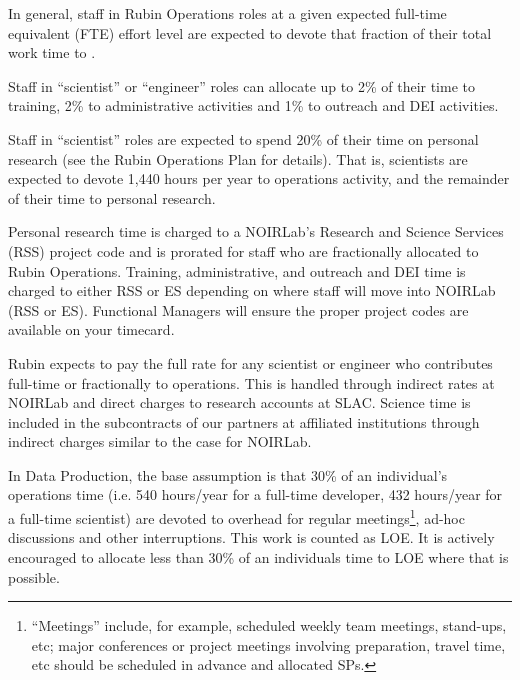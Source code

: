 In general, staff in Rubin Operations roles at a given expected full-time equivalent (FTE) effort level are expected to devote that fraction of their total work time to \RO.

Staff in ``scientist'' or ``engineer'' roles can allocate up to 2\% of their time to training, 2\% to administrative activities and 1\% to outreach and DEI activities.

Staff in ``scientist'' roles are expected to spend 20\% of their time on personal research (see the Rubin Operations Plan for details).
That is, scientists are expected to devote 1,440 hours per
year to operations activity, and the remainder of their time to personal research.

Personal research time is charged to a NOIRLab's Research and Science Services (RSS) project code and is prorated for staff who are fractionally allocated to Rubin Operations. 
Training, administrative, and outreach and DEI time is charged to either RSS or ES depending on where staff will move into NOIRLab (RSS or ES). 
Functional Managers will ensure the proper project codes are available on your timecard.

Rubin expects to pay the full rate for any scientist or engineer who contributes full-time or fractionally to operations.
This is handled through indirect rates at NOIRLab and direct charges to research accounts at SLAC.
Science time is included in the subcontracts of our partners at affiliated institutions through indirect charges
similar to the case for NOIRLab.

In Data Production, the base assumption is that 30\% of an individual's \RO operations time (i.e. 540 hours/year for a full-time developer, 432 hours/year for a full-time scientist) are devoted to
overhead for regular meetings\footnote{``Meetings'' include, for example, scheduled weekly team meetings, stand-ups, etc;
major conferences or project meetings involving preparation, travel time, etc should be scheduled in advance and allocated \glspl{SP}.},
ad-hoc discussions and other interruptions.
This work is counted as \gls{LOE}.
It is actively encouraged to allocate less than 30\% of an individuals time to \gls{LOE} where that is possible.


